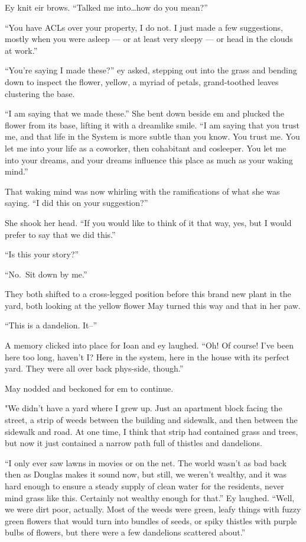 Ey knit eir brows. ``Talked me into\ldots how do you mean?''

``You have ACLs over your property, I do not. I just made a few suggestions, mostly when you were asleep — or at least very sleepy — or head in the clouds at work.''

``You're saying I made these?'' ey asked, stepping out into the grass and bending down to inspect the flower, yellow, a myriad of petals, grand-toothed leaves clustering the base.

``I am saying that we made these.'' She bent down beside em and plucked the flower from its base, lifting it with a dreamlike smile. ``I am saying that you trust me, and that life in the System is more subtle than you know. You trust me. You let me into your life as a coworker, then cohabitant and cosleeper. You let me into your dreams, and your dreams influence this place as much as your waking mind.''

That waking mind was now whirling with the ramifications of what she was saying. ``I did this on your suggestion?''

She shook her head. ``If you would like to think of it that way, yes, but I would prefer to say that we did this.''

``Is this your story?''

``No.~Sit down by me.''

They both shifted to a cross-legged position before this brand new plant in the yard, both looking at the yellow flower May turned this way and that in her paw.

``This is a dandelion. It--''

A memory clicked into place for Ioan and ey laughed. ``Oh! Of course! I've been here too long, haven't I? Here in the system, here in the house with its perfect yard. They were all over back phys-side, though.''

May nodded and beckoned for em to continue.

"We didn't have a yard where I grew up. Just an apartment block facing the street, a strip of weeds between the building and sidewalk, and then between the sidewalk and road. At one time, I think that strip had contained grass and trees, but now it just contained a narrow path full of thistles and dandelions.

``I only ever saw lawns in movies or on the net. The world wasn't as bad back then as Douglas makes it sound now, but still, we weren't wealthy, and it was hard enough to ensure a steady supply of clean water for the residents, never mind grass like this. Certainly not wealthy enough for that.'' Ey laughed. ``Well, we were dirt poor, actually. Most of the weeds were green, leafy things with fuzzy green flowers that would turn into bundles of seeds, or spiky thistles with purple bulbs of flowers, but there were a few dandelions scattered about.''

